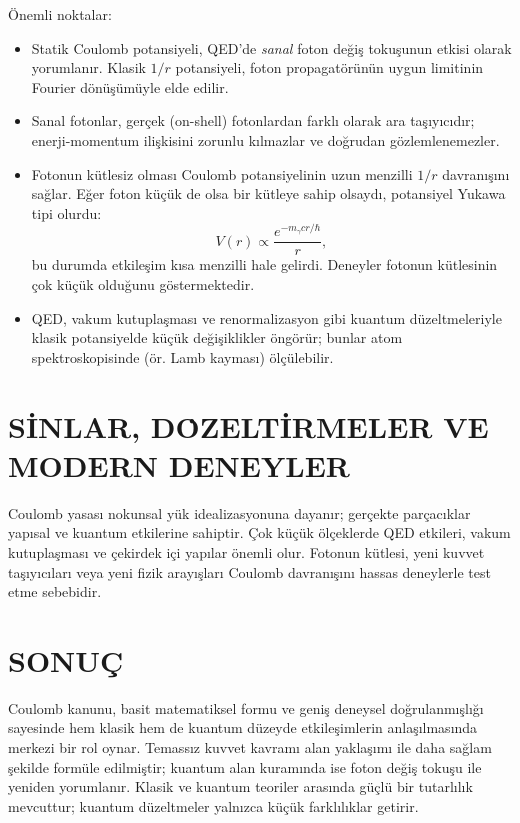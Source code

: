 \documentclass[conference,a4paper]{IEEEtran}
\begin{document}
Önemli noktalar:
\begin{itemize}
  \item Statik Coulomb potansiyeli, QED'de \textit{sanal} foton değiş tokuşunun etkisi olarak yorumlanır. Klasik \(1/r\) potansiyeli, foton propagatörünün uygun limitinin Fourier dönüşümüyle elde edilir.
  \item Sanal fotonlar, gerçek (on-shell) fotonlardan farklı olarak ara taşıyıcıdır; enerji-momentum ilişkisini zorunlu kılmazlar ve doğrudan gözlemlenemezler.
  \item Fotonun kütlesiz olması Coulomb potansiyelinin uzun menzilli \(1/r\) davranışını sağlar. Eğer foton küçük de olsa bir kütleye sahip olsaydı, potansiyel Yukawa tipi olurdu:
  \begin{equation}
  V(r) \propto \frac{e^{-m_\gamma c r/\hbar}}{r},
  \end{equation}
  bu durumda etkileşim kısa menzilli hale gelirdi. Deneyler fotonun kütlesinin çok küçük olduğunu göstermektedir.
  \item QED, vakum kutuplaşması ve renormalizasyon gibi kuantum düzeltmeleriyle klasik potansiyelde küçük değişiklikler öngörür; bunlar atom spektroskopisinde (ör. Lamb kayması) ölçülebilir.
\end{itemize}

\section{S\.{I}NLAR, D\.{O}ZELT\.{I}RMELER VE MODERN DENEYLER}
Coulomb yasası nokunsal yük idealizasyonuna dayanır; gerçekte parçacıklar yapısal ve kuantum etkilerine sahiptir. Çok küçük ölçeklerde QED etkileri, vakum kutuplaşması ve çekirdek içi yapılar önemli olur. Fotonun kütlesi, yeni kuvvet taşıyıcıları veya yeni fizik arayışları Coulomb davranışını hassas deneylerle test etme sebebidir.

\section{SONUÇ}
Coulomb kanunu, basit matematiksel formu ve geniş deneysel doğrulanmışlığı sayesinde hem klasik hem de kuantum düzeyde etkileşimlerin anlaşılmasında merkezi bir rol oynar. Temassız kuvvet kavramı alan yaklaşımı ile daha sağlam şekilde formüle edilmiştir; kuantum alan kuramında ise foton değiş tokuşu ile yeniden yorumlanır. Klasik ve kuantum teoriler arasında güçlü bir tutarlılık mevcuttur; kuantum düzeltmeler yalnızca küçük farklılıklar getirir.
\end{document}
